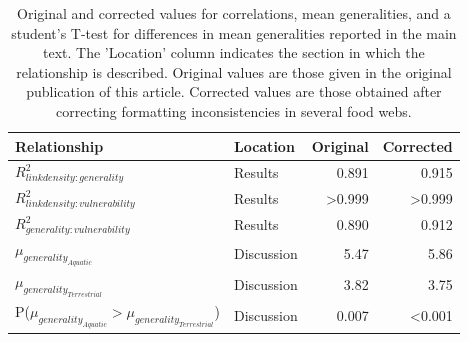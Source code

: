 \documentclass[12pt]{article}
\begin{document}
\begin{spacing}{2.0}
\begin{table}[h!]
\caption{Original and corrected values for correlations, mean generalities, and a student's T-test for differences in mean generalities reported in the main text. The 'Location' column indicates the section in which the relationship is described. Original values are those given in the original publication of this article. Corrected values are those obtained after correcting formatting inconsistencies in several food webs.}
\label{corr_comparison}
\small
\begin{tabular}{l l | r | r}
Relationship & Location & Original & Corrected \\
\hline
$R^2_{link density:generality}$ & Results & 0.891 & 0.915 \\
$R^2_{link density:vulnerability}$ & Results & \textgreater0.999 & \textgreater0.999 \\
$R^2_{generality:vulnerability}$ & Results & 0.890 & 0.912 \\
$\mu_{generality_{Aquatic}}$ & Discussion & 5.47 & 5.86 \\
$\mu_{generality_{Terrestrial}}$ & Discussion & 3.82 & 3.75 \\
P($\mu_{generality_{Aquatic}}>\mu_{generality_{Terrestrial}}$) & Discussion & 0.007 & \textless0.001 \\
\end{tabular}
\end{table}



\end{spacing}
\end{document}
